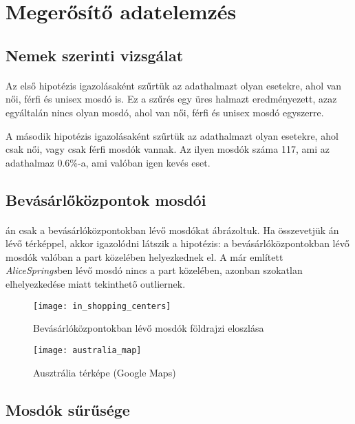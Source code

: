 	\section{Megerősítő adatelemzés}
	\subsection{Nemek szerinti vizsgálat}
	\paragraph{}
	\begin{compactlist}
		\item Az első hipotézis igazolásaként szűrtük az adathalmazt olyan esetekre, ahol van női, férfi és unisex mosdó is.	Ez a szűrés egy üres halmazt eredményezett, azaz egyáltalán nincs olyan mosdó, ahol van női, férfi és unisex mosdó egyszerre.
		\item A második hipotézis igazolásaként szűrtük az adathalmazt olyan esetekre, ahol csak női, vagy csak férfi mosdók vannak. Az ilyen mosdók száma 117, ami az adathalmaz 0.6\%-a, ami valóban igen kevés eset.
	\end{compactlist}
	\subsection{Bevásárlőközpontok mosdói}
	\paragraph{}
		án csak a bevásárlóközpontokban lévő mosdókat ábrázoltuk. Ha összevetjük án lévő térképpel, akkor igazolódni látszik a hipotézis: a bevásárlóközpontokban lévő mosdók valóban a part közelében helyezkednek el. A már említett \textit{AliceSprings}ben lévő mosdó nincs a part közelében, azonban szokatlan elhelyezkedése miatt tekinthető outliernek.
		\begin{figure}[h]
			\centering	
			\texttt{[image: in\_shopping\_centers]}
			\caption{Bevásárlóközpontokban lévő mosdók földrajzi eloszlása}
			\label{fig:toilets_in_shopping_centers}
		\end{figure}		
		\begin{figure}[h]
			\centering	
			\texttt{[image: australia\_map]}
			\caption{Ausztrália térképe (Google Maps)}
			\label{fig:map}
		\end{figure}

	\subsection{Mosdók sűrűsége}
